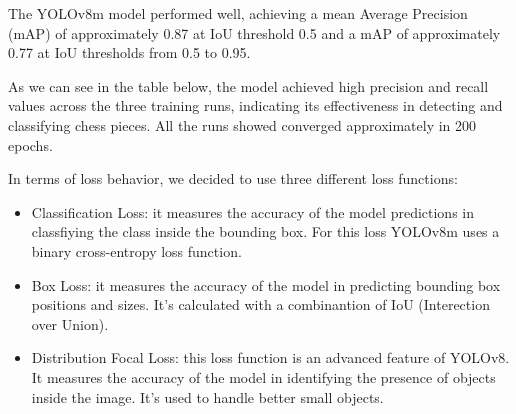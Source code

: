 The YOLOv8m model performed well, achieving a mean Average Precision (mAP) of
 approximately 0.87 at IoU threshold 0.5 and a
  mAP of approximately 0.77 at IoU thresholds from 0.5 to 0.95.

As we can see in the table below, the model achieved high precision
 and recall values across the three training runs,
indicating its effectiveness in detecting and classifying chess pieces.
All the runs showed converged approximately in 200 epochs.

\begin{table}[ht]
\centering
\caption{Key performance metrics for the three YOLOv8m training runs.}
\label{tab:YOLOv8-results}
\end{table}


In terms of loss behavior, we decided to use three different loss functions:
\begin{itemize}
    \item Classification Loss: it measures the accuracy of the model predictions in classfiying the class inside the bounding box.
    For this loss YOLOv8m uses a binary cross-entropy loss function.
    \item Box Loss: it measures the accuracy of the model in predicting bounding box positions and sizes. It's calculated with a combinantion of IoU (Interection over Union).
    \item Distribution Focal Loss: this loss function is an advanced feature of YOLOv8. It measures the accuracy of the model in identifying the presence of objects inside the image. It's used to handle better small objects.
\end{itemize}

\begin{table}[ht]
\centering
\caption{Final loss values for the three YOLOv8m runs. All values are approximate and taken at convergence (step $\sim$200).}
\label{tab:yolov8-loss}
\end{table}

